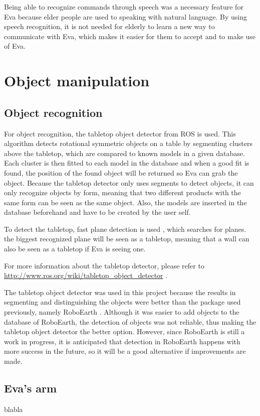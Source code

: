 \documentclass[project_eva.tex]{subfiles}
\begin{document}
Being able to recognize commands through speech was a necessary feature for Eva because elder people are used to speaking 
with natural language. By using speech recognition, it is not needed for elderly to learn a new way to communicate with 
Eva, which makes it easier for them to accept and to make use of Eva.

\newpage

\section*{Object manipulation}
\subsection*{Object recognition}
For object recognition, the tabletop object detector from ROS is used. This algorithm detects rotational symmetric objects on a table by segmenting clusters above the tabletop, which are compared to known models in a given database. Each cluster is then fitted to each model in the database and when a good fit is found, the position of the found object will be returned so Eva can grab the object. Because the tabletop detector only uses segments to detect objects, it can only recognize objects by form, meaning that two different products with the same form can be seen as the same object. Also, the models are inserted in the database beforehand and have to be created by the user self.

To detect the tabletop, fast plane detection is used \cite{plane}, which 
searches for planes. the biggest recognized plane will be seen as a tabletop, meaning that a wall can also be seen as a 
tabletop if Eva is seeing one.

For more information about the tabletop detector, please refer to \url{http://www.ros.org/wiki/tabletop\_object\_detector} \cite{tabletop}.

The tabletop object detector was used in this project because the results in segmenting and distinguishing the objects were better than the package used previously, namely RoboEarth \cite{Roboearth}. Although it was easier to add objects to the database of RoboEarth, the detection of objects was not reliable, thus making the tabletop object detector the better option. However, since RoboEarth is still a work in progress, it is anticipated that detection in RoboEarth happens with more success in the future, so it will be a good alternative if improvements are made.

\subsection*{Eva's arm}
blabla
\end{document}
